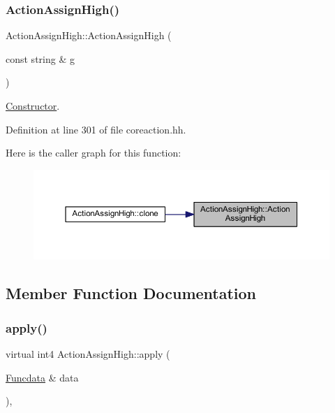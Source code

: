 \subsubsection{\texorpdfstring{ActionAssignHigh()}{ActionAssignHigh()}}
{\footnotesize\ttfamily Action\+Assign\+High\+::\+Action\+Assign\+High (\begin{DoxyParamCaption}\item[{const string \&}]{g }\end{DoxyParamCaption})\hspace{0.3cm}{\ttfamily [inline]}}



\mbox{\hyperlink{class_constructor}{Constructor}}. 



Definition at line 301 of file coreaction.\+hh.

Here is the caller graph for this function\+:
\nopagebreak
\begin{figure}[H]
\begin{center}
\leavevmode
\includegraphics[width=350pt]{class_action_assign_high_afdf83f563f000106561b4e9662430c8a_icgraph}
\end{center}
\end{figure}


\subsection{Member Function Documentation}
\mbox{\label{class_action_assign_high_aa0e3cd08123d3a5b60f0f0c35468b5ae}} 
\subsubsection{\texorpdfstring{apply()}{apply()}}
{\footnotesize\ttfamily virtual int4 Action\+Assign\+High\+::apply (\begin{DoxyParamCaption}\item[{\mbox{\hyperlink{class_funcdata}{Funcdata}} \&}]{data }\end{DoxyParamCaption})\hspace{0.3cm}{\ttfamily [inline]}, {\ttfamily [virtual]}}



